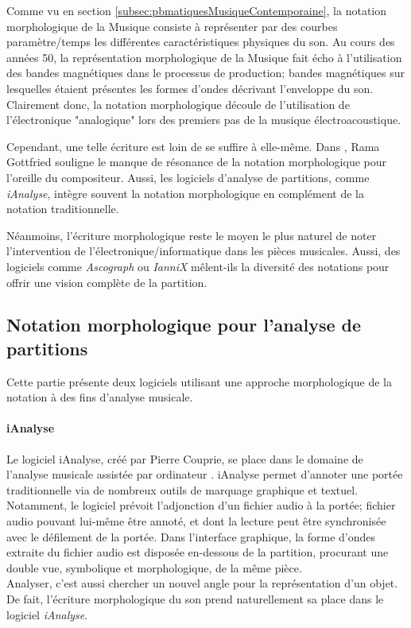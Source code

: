 Comme vu en section \ref{subsec:pbmatiquesMusiqueContemporaine}, la notation morphologique de la Musique consiste à représenter par des courbes paramètre/temps les différentes caractéristiques physiques du son.
Au cours des années 50, la représentation morphologique de la Musique fait écho à l'utilisation des bandes magnétiques dans le processus de production; bandes magnétiques sur lesquelles étaient présentes les formes d'ondes décrivant l'enveloppe du son.\\
Clairement donc, la notation morphologique découle de l'utilisation de l'électronique "analogique" lors des premiers pas de la musique électroacoustique\cite{bosseur2005}.

Cependant, une telle écriture est loin de se suffire à elle-même. Dans \cite{gottfried2017}, Rama Gottfried souligne le manque de résonance de la notation morphologique pour l'oreille du compositeur. Aussi, les logiciels d'analyse de partitions, comme \textit{iAnalyse}, intègre souvent la notation morphologique en complément de la notation traditionnelle.

Néanmoins, l'écriture morphologique reste le moyen le plus naturel de noter l'intervention de l'électronique/informatique dans les pièces musicales. Aussi, des logiciels comme \textit{Ascograph} ou \textit{IanniX} mêlent-ils la diversité des notations pour offrir une vision complète de la partition.   

\subsection{Notation morphologique pour l'analyse de partitions}
\label{subsec:outilsMorphologiquesAnalyse}

Cette partie présente deux logiciels utilisant une approche morphologique de la notation à des fins d'analyse musicale.

\paragraph{iAnalyse} Le logiciel iAnalyse, créé par Pierre Couprie, se place dans le domaine de \og l'analyse musicale assistée par ordinateur \fg \cite{couprie2008}. iAnalyse permet d'annoter une portée traditionnelle via de nombreux outils de marquage graphique et textuel. Notamment, le logiciel prévoit l'adjonction d'un fichier audio à la portée; fichier audio pouvant lui-même être annoté, et dont la lecture peut être synchronisée avec le défilement de la portée. Dans l'interface graphique, la forme d'ondes extraite du fichier audio est disposée en-dessous de la partition, procurant une double vue, symbolique et morphologique, de la même pièce.\\
Analyser, c'est aussi chercher un nouvel angle pour la représentation d'un objet. De fait, l'écriture morphologique du son prend naturellement sa place dans le logiciel \textit{iAnalyse}. 

